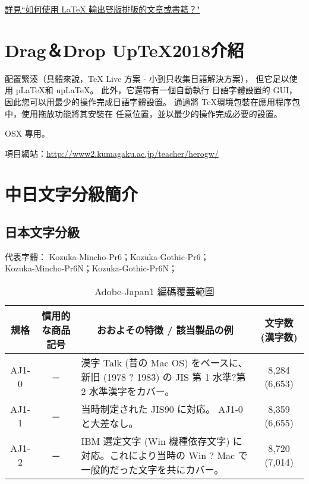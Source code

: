 \begin{appendix}
\par\href{https://www.zhihu.com/question/20544732/answer/15437234}%
{詳見``如何使用 LaTeX 輸出豎版排版的文章或書籍？"}

\section{ Drag＆Drop Up\TeX 2018介紹}\label{uptex-xiongben}

配置緊湊（具體來說，TeX Live 方案 - 小到只收集日語解決方案），
但它足以使用 p\LaTeX 和 up\LaTeX。 此外，它還帶有一個自動執行
日語字體設置的 GUI，因此您可以用最少的操作完成日語字體設置。
通過將 \TeX 環境包裝在應用程序包中，使用拖放功能將其安裝在
任意位置，並以最少的操作完成必要的設置。

OSX 專用。

項目網站：\url{http://www2.kumagaku.ac.jp/teacher/herogw/}

\clearpage
\section{中日文字分級簡介}
\subsection{日本文字分級}
{\gtfamily
代表字體： Kozuka-Mincho-Pr6；Kozuka-Gothic-Pr6；\\
\qquad \qquad \qquad Kozuka-Mincho-Pr6N；Kozuka-Gothic-Pr6N；}

\begin{table}[h]
\caption{\fontsize{12pt}{15pt}\selectfont Adobe-Japan1 編碼覆蓋範圍} %
\centering %
\begin{tabular}{|c|c|p{8cm}|c|}%
\hline  %

規格 & 慣用的な商品記号	& \multicolumn{1}{|c|}{おおよその特徴 / 該当製品の例} & 文字数(漢字数) \\

\hline  %
AJ1-0 &	─	 & 漢字 Talk (昔の Mac OS)
をベースに、新旧 (1978 ? 1983) の JIS 第 1 水準?第 2 水準漢字をカバー。
& 8,284 (6,653) \\
\hline
AJ1-1	& ─ &	当時制定された JIS90 に対応。
AJ1-0 と大差なし。 & 	8,359 (6,655) \\
\hline
AJ1-2	& ─	 &  IBM 選定文字 (Win 機種依存文字)
に対応。これにより当時の Win ? Mac で一般的だった文字を共にカバー。
& 	8,720 (7,014) \\
\hline


\end{tabular}
\end{table}
\end{appendix}
